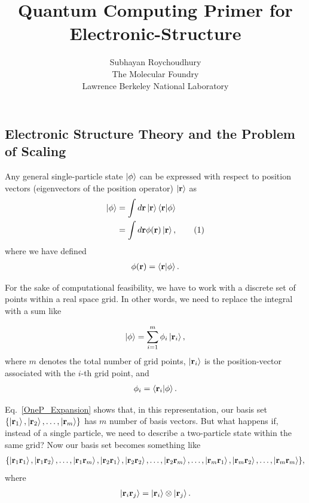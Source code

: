 \documentclass[12pt,oneside]{book}
\title{Quantum Computing Primer for Electronic-Structure}
\author{Subhayan Roychoudhury\\ The Molecular Foundry\\ Lawrence Berkeley National Laboratory}
\date{}
\newcommand\numberthis{\addtocounter{equation}{1}\tag{\theequation}}
\begin{document}
\maketitle

\subsection*{Electronic Structure Theory and the Problem of Scaling}

Any general single-particle state $\ket{\phi}$ can be expressed with respect to position vectors (eigenvectors of the position operator) $\ket{\mathbf{r}}$ as
\begin{align*}
    \ket{\phi} &{}= \int d \mathbf{r} \ket{\mathbf{r}}\braket{\mathbf{r}|\phi}\\
    &{} = \int d\mathbf{r} \phi(\mathbf{r})\ket{\mathbf{r}}, \numberthis
\end{align*}
where we have defined
\begin{align}
    \phi(\mathbf{r})= \braket{\mathbf{r}|\phi}.
\end{align}

For the sake of computational feasibility, we have to work with a discrete set of points within a real space grid. In other words, we need to replace the integral with a sum like

\begin{align}\label{OneP_Expansion}
    \ket{\phi} = \sum_{i=1}^m \phi_i \ket{\mathbf{r}_i},
\end{align}
where $m$ denotes the total number of grid points, $\ket{\mathbf{r}_i}$ is the position-vector associated with the $i$-th grid point, and 
\begin{align}
    \phi_i=\braket{\mathbf{r}_i|\phi}.
\end{align}

Eq.~\ref{OneP_Expansion} shows that, in this representation, our basis set $\{\ket{\mathbf{r}_1}, \ket{\mathbf{r}_2},\hdots, \ket{\mathbf{r}_m}\}$ has $m$ number of basis vectors. But what happens if, instead of a single particle, we need to describe a two-particle state within the same grid? Now our basis set becomes something like
\begin{align*}
    \{\ket{\mathbf{r}_1\mathbf{r}_1}, \ket{\mathbf{r}_1\mathbf{r}_2} , \hdots , \ket{\mathbf{r}_1\mathbf{r}_m}, \ket{\mathbf{r}_2\mathbf{r}_1} , \ket{\mathbf{r}_2\mathbf{r}_2}, \hdots , \ket{\mathbf{r}_2\mathbf{r}_m}, \hdots , \ket{\mathbf{r}_m\mathbf{r}_1}, \ket{\mathbf{r}_m\mathbf{r}_2}, \hdots , \ket{\mathbf{r}_m\mathbf{r}_m}\},
\end{align*}
where 
\begin{align*}
\ket{\mathbf{r}_i \mathbf{r}_j} = \ket{\mathbf{r}_i}\otimes\ket{\mathbf{r}_j}.
\end{align*}
\end{document}

